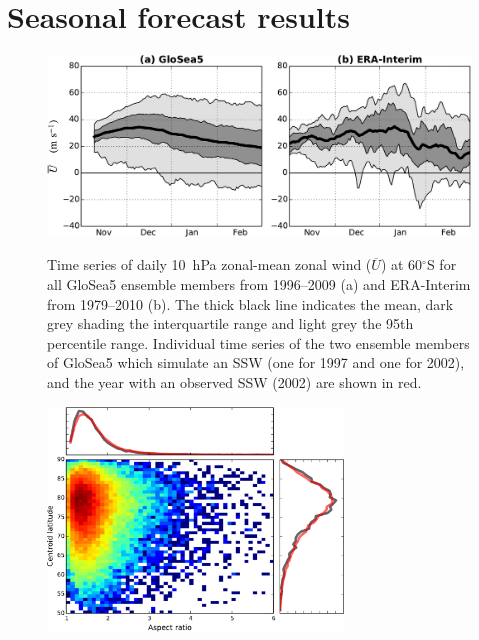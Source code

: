 \section{Seasonal forecast results}


\begin{figure}[t]
  \noindent\includegraphics[width=\textwidth,angle=0]{figures/chapter-seasonal/zmzw_climatologies_nh.pdf}\\
  \caption[Comparison of GloSea5 and ERA-Interim zonal-mean zonal wind
climatologies.]{Time series of daily 10~hPa zonal-mean zonal wind
($\overline{U}$) at 60$^{\circ}$S for all GloSea5 ensemble members from
1996--2009 (a) and ERA-Interim from 1979--2010 (b). The thick black line
indicates the mean, dark grey shading the interquartile range and light grey the
95th percentile range. Individual time series of the two ensemble members of
GloSea5 which simulate an SSW (one for 1997 and one for 2002), and the year with
an observed SSW (2002) are shown in red.}\label{fig:sh_zmzw_clim}
\end{figure}

\begin{figure}[t]
  \noindent\includegraphics[width=0.7\textwidth,angle=0]{figures/chapter-seasonal/GloSea_moments_histogram.pdf}\\
  \caption[]{}\label{fig:sh_zmzw_clim}
\end{figure}


